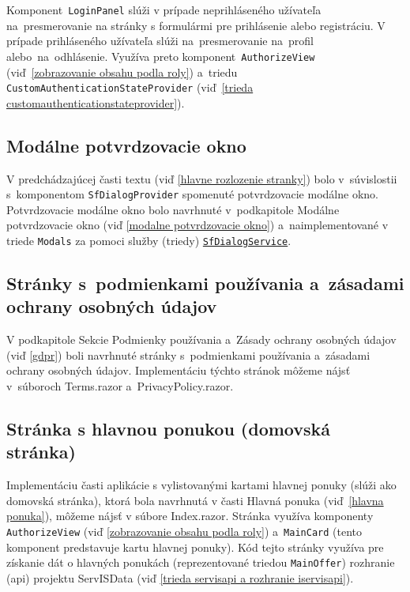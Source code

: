 Komponent~\verb|LoginPanel| slúži v prípade neprihláseného užívateľa na~presmerovanie na stránky s formulármi pre prihlásenie alebo registráciu. V prípade prihláseného užívateľa slúži na~presmerovanie na~profil alebo~na~odhlásenie. Využíva preto komponent~\verb|AuthorizeView| (viď~\ref{zobrazovanie obsahu podla roly}) a~triedu \verb|CustomAuthenticationStateProvider| (viď~\ref{trieda customauthenticationstateprovider}).

\subsection{Modálne potvrdzovacie okno}
\label{modalne potvrdzovacie okno2}

V predchádzajúcej časti textu (viď \ref{hlavne rozlozenie stranky}) bolo v~súvislostii s~komponentom \verb|SfDialogProvider| spomenuté potvrdzovacie modálne okno. Potvrdzovacie modálne okno bolo navrhnuté v~podkapitole Modálne potvrdzovacie okno (viď \ref{modalne potvrdzovacie okno}) a~naimplementované v triede \verb|Modals| za pomoci služby (triedy) \href{https://help.syncfusion.com/cr/blazor/Syncfusion.Blazor.Popups.SfDialogService.html?&_ga=2.197376751.151320961.1689274245-1159269374.1655468845#Syncfusion_Blazor_Popups_SfDialogService_ConfirmAsync_System_String_System_String_Syncfusion_Blazor_Popups_DialogOptions_}{\texttt{SfDialogService}}.

\subsection{Stránky s~podmienkami používania a~zásadami ochrany osobných údajov}

V podkapitole Sekcie Podmienky používania a~Zásady ochrany osobných údajov (viď \ref{gdpr}) boli navrhnuté stránky s~podmienkami používania a~zásadami ochrany osobných údajov. Implementáciu týchto stránok môžeme nájsť v~súboroch Terms.razor a~PrivacyPolicy.razor.

\subsection{Stránka s hlavnou ponukou (domovská stránka)}

Implementáciu časti aplikácie s vylistovanými kartami hlavnej ponuky (slúži ako domovská stránka), ktorá bola navrhnutá v časti Hlavná ponuka (viď~\ref{hlavna ponuka}), môžeme nájsť v súbore Index.razor. Stránka využíva komponenty \verb|AuthorizeView| (viď \ref{zobrazovanie obsahu podla roly}) a~\verb|MainCard| (tento komponent predstavuje kartu hlavnej ponuky). Kód tejto stránky využíva pre získanie dát o hlavných ponukách (reprezentované triedou \verb|MainOffer|) rozhranie (api) projektu ServISData (viď \ref{trieda servisapi a rozhranie iservisapi}).

